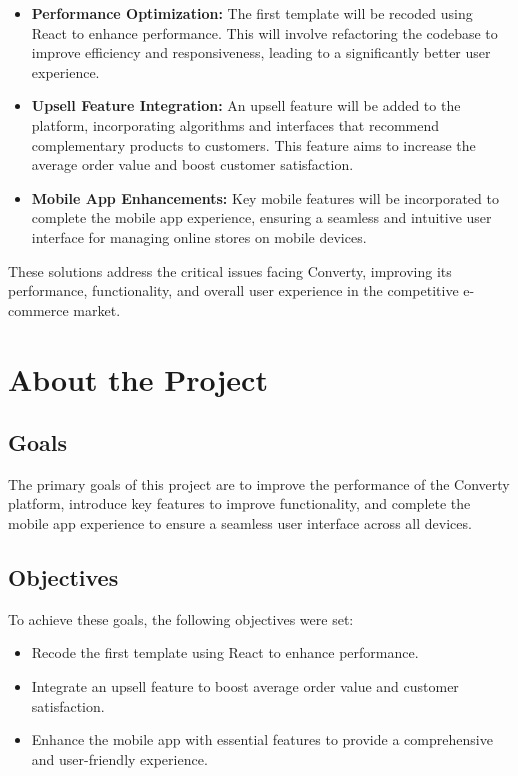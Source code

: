 \begin{itemize}
  \item \textbf{Performance Optimization:} The first template will be recoded using React to enhance performance. This will involve refactoring the codebase to improve efficiency and responsiveness, leading to a significantly better user experience.
  \item \textbf{Upsell Feature Integration:} An upsell feature will be added to the platform, incorporating algorithms and interfaces that recommend complementary products to customers. This feature aims to increase the average order value and boost customer satisfaction.
  \item \textbf{Mobile App Enhancements:} Key mobile features will be incorporated to complete the mobile app experience, ensuring a seamless and intuitive user interface for managing online stores on mobile devices.
\end{itemize}

These solutions address the critical issues facing Converty, improving its performance, functionality, and overall user experience in the competitive e-commerce market.
\newline

\section{About the Project}

\subsection{Goals}
The primary goals of this project are to improve the performance of the Converty platform, introduce key features to improve functionality, and complete the mobile app experience to ensure a seamless user interface across all devices.

\subsection{Objectives}
To achieve these goals, the following objectives were set:
\begin{itemize}
    \item Recode the first template using React to enhance performance.
    \item Integrate an upsell feature to boost average order value and customer satisfaction.
    \item Enhance the mobile app with essential features to provide a comprehensive and user-friendly experience.
\end{itemize}

